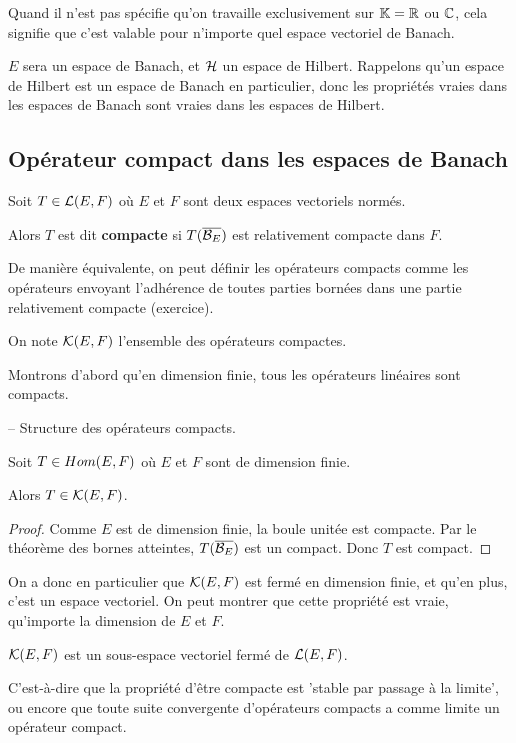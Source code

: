 Quand il n'est pas spécifie qu'on travaille exclusivement sur $\mathbb{K} =
\mathbb{R}$ ou $\mathbb{C}$, cela signifie que c'est valable pour n'importe quel espace
vectoriel de Banach.

$E$ sera un espace de Banach, et $\mathcal{H}$ un espace de Hilbert.  Rappelons
qu'un espace de Hilbert est un espace de Banach en particulier, donc les
propriétés vraies dans les espaces de Banach sont vraies dans les espaces de
Hilbert.

\subsection{Opérateur compact dans les espaces de Banach}

\begin{definition}
	Soit $T \in \mathcal{L}(E, F)$ où $E$ et $F$ sont deux espaces
	vectoriels normés.

	Alors $T$ est dit \textbf{compacte} si $T(\overline{\mathcal{B}_{E}})$ est relativement compacte
	dans $F$.
\end{definition}

De manière équivalente, on peut définir les opérateurs compacts comme les
opérateurs envoyant l'adhérence de toutes parties bornées dans une partie relativement
compacte (exercice).

On note $\mathcal{K}(E, F)$ l'ensemble des opérateurs compactes.

Montrons d'abord qu'en dimension finie, tous les opérateurs linéaires sont
compacts.

-- Structure des opérateurs compacts.

\begin{proposition}
	Soit $T \in Hom(E, F)$ où $E$ et $F$ sont de dimension finie.

	Alors $T \in \mathcal{K}(E, F)$.
\end{proposition}

\begin{proof}
	Comme $E$ est de dimension finie, la boule unitée est compacte. Par le
	théorème des bornes atteintes, $T(\overline{\mathcal{B}_{E}})$ est un compact.
	Donc $T$ est compact.
\end{proof}

On a donc en particulier que $\mathcal{K}(E, F)$ est fermé en dimension
finie, et qu'en plus, c'est un espace vectoriel.
On peut montrer que cette propriété est vraie, qu'importe la dimension de
$E$ et $F$.

\begin{proposition}
	$\mathcal{K}(E, F)$ est un sous-espace vectoriel fermé de
	$\mathcal{L}(E, F)$.

	C'est-à-dire que la propriété d'être compacte est 'stable par passage à la
	limite', ou encore que toute suite convergente d'opérateurs compacts a
	comme limite un opérateur compact.
\end{proposition}

